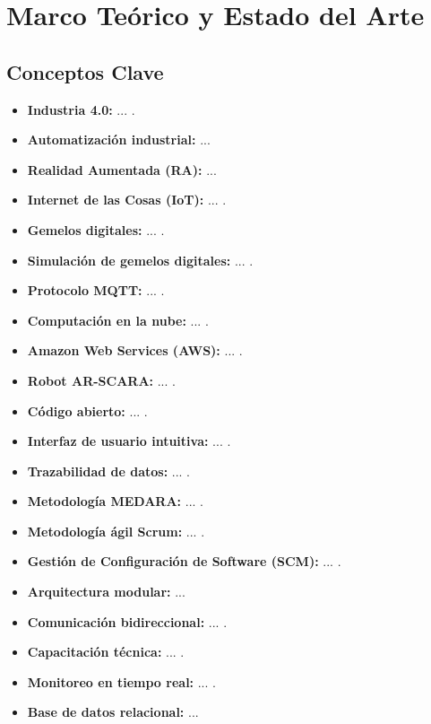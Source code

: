 \documentclass[12pt,letterpaper]{report}
\begin{document}
	\chapter{Marco Teórico y Estado del Arte}
	\section{Conceptos Clave}
	\begin{itemize}
		\item \textbf{Industria 4.0:} ... \cite{garcia_industria_adoption_2023}.
		\item \textbf{Automatización industrial:} ...
		\item \textbf{Realidad Aumentada (RA):} ...
		\item \textbf{Internet de las Cosas (IoT):} ... \cite{aws_iot_industrial_2024}.
		\item \textbf{Gemelos digitales:} ... \cite{mathworks_scara_2024}.
		\item \textbf{Simulación de gemelos digitales:} ... \cite{mathworks_kinematics_scara_2023}.
		\item \textbf{Protocolo MQTT:} ... \cite{aws_connected_factory_2020}.
		\item \textbf{Computación en la nube:} ... \cite{aws_iot_industrial_2024}.
		\item \textbf{Amazon Web Services (AWS):} ... \cite{aws_connected_factory_2020}.
		\item \textbf{Robot AR-SCARA:} ... \cite{mathworks_scara_2024}.
		\item \textbf{Código abierto:} ... \cite{morales_github_repo}.
		\item \textbf{Interfaz de usuario intuitiva:} ... \cite{morales_ui_design}.
		\item \textbf{Trazabilidad de datos:} ... \cite{ieee_scm_std}.
		\item \textbf{Metodología MEDARA:} ... \cite{zamora_medara_2022}.
		\item \textbf{Metodología ágil Scrum:} ... \cite{rodriguez_scrum_pcs_2023}.
		\item \textbf{Gestión de Configuración de Software (SCM):} ... \cite{ieee_scm_std}.
		\item \textbf{Arquitectura modular:} ...
		\item \textbf{Comunicación bidireccional:} ... \cite{aws_iot_industrial_2024}.
		\item \textbf{Capacitación técnica:} ... \cite{zamora_medara_2022}.
		\item \textbf{Monitoreo en tiempo real:} ... \cite{aws_connected_factory_2020}.
		\item \textbf{Base de datos relacional:} ...
	\end{itemize}
	
\end{document}
